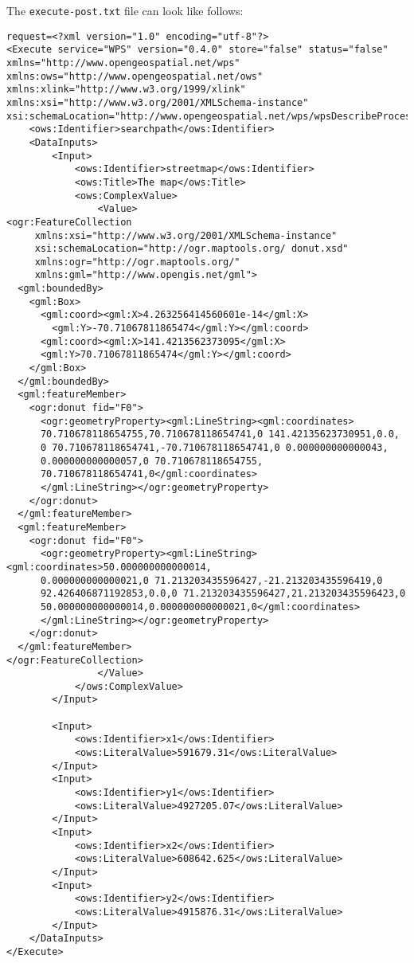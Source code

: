 \documentclass[a4paper,11pt]{article}
\begin{document}
    The \texttt{execute-post.txt} file can look like follows:
    \begin{verbatim}
request=<?xml version="1.0" encoding="utf-8"?>
<Execute service="WPS" version="0.4.0" store="false" status="false"
xmlns="http://www.opengeospatial.net/wps"
xmlns:ows="http://www.opengeospatial.net/ows"
xmlns:xlink="http://www.w3.org/1999/xlink"
xmlns:xsi="http://www.w3.org/2001/XMLSchema-instance"
xsi:schemaLocation="http://www.opengeospatial.net/wps/wpsDescribeProcess.xsd">
    <ows:Identifier>searchpath</ows:Identifier>
    <DataInputs>
        <Input>
            <ows:Identifier>streetmap</ows:Identifier>
            <ows:Title>The map</ows:Title>
            <ows:ComplexValue>
                <Value>
<ogr:FeatureCollection
     xmlns:xsi="http://www.w3.org/2001/XMLSchema-instance"
     xsi:schemaLocation="http://ogr.maptools.org/ donut.xsd"
     xmlns:ogr="http://ogr.maptools.org/"
     xmlns:gml="http://www.opengis.net/gml">
  <gml:boundedBy>
    <gml:Box>
      <gml:coord><gml:X>4.263256414560601e-14</gml:X>
        <gml:Y>-70.71067811865474</gml:Y></gml:coord>
      <gml:coord><gml:X>141.4213562373095</gml:X>
      <gml:Y>70.71067811865474</gml:Y></gml:coord>
    </gml:Box>
  </gml:boundedBy>                      
  <gml:featureMember>
    <ogr:donut fid="F0">
      <ogr:geometryProperty><gml:LineString><gml:coordinates>
      70.710678118654755,70.710678118654741,0 141.42135623730951,0.0,
      0 70.710678118654741,-70.710678118654741,0 0.000000000000043,
      0.000000000000057,0 70.710678118654755,
      70.710678118654741,0</gml:coordinates>
      </gml:LineString></ogr:geometryProperty>
    </ogr:donut>
  </gml:featureMember>
  <gml:featureMember>
    <ogr:donut fid="F0">
      <ogr:geometryProperty><gml:LineString><gml:coordinates>50.000000000000014,
      0.000000000000021,0 71.213203435596427,-21.213203435596419,0 
      92.426406871192853,0.0,0 71.213203435596427,21.213203435596423,0 
      50.000000000000014,0.000000000000021,0</gml:coordinates>
      </gml:LineString></ogr:geometryProperty>
    </ogr:donut>
  </gml:featureMember>
</ogr:FeatureCollection>
                </Value>
            </ows:ComplexValue>
        </Input>

        <Input>
            <ows:Identifier>x1</ows:Identifier>
            <ows:LiteralValue>591679.31</ows:LiteralValue>
        </Input>
        <Input>
            <ows:Identifier>y1</ows:Identifier>
            <ows:LiteralValue>4927205.07</ows:LiteralValue>
        </Input>
        <Input>
            <ows:Identifier>x2</ows:Identifier>
            <ows:LiteralValue>608642.625</ows:LiteralValue>
        </Input>
        <Input>
            <ows:Identifier>y2</ows:Identifier>
            <ows:LiteralValue>4915876.31</ows:LiteralValue>
        </Input>
    </DataInputs>
</Execute>
    \end{verbatim}
     
\end{document}
